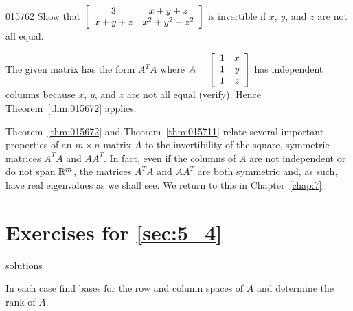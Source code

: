 {{\begin{example}{}{015762}
Show that $\left[ \begin{array}{cc}
3 & x + y + z \\
x + y + z & x^2 +y^2 + z^2
\end{array} \right]$ is invertible if $x$, $y$, and $z$ are not all equal.

\begin{solution}
The given matrix has the form $A^{T}A$ where $A =
\left[ \begin{array}{rr}
1 & x\\
1 & y \\
1 & z
\end{array} \right]$ has independent columns because $x$, $y$, and $z$ are not all equal (verify). Hence Theorem~\ref{thm:015672} applies.
\end{solution}
\end{example}

Theorem~\ref{thm:015672} and Theorem~\ref{thm:015711} relate several important properties of an $m \times n$ matrix $A$ to the invertibility of the square, symmetric matrices $A^{T}A$ and $AA^{T}$. In fact, even if the columns of $A$ are not independent or do not span $\mathbb{R}^m$, the matrices $A^{T}A$ and $AA^T$ are both symmetric and, as such, have real eigenvalues as we shall see. We return to this in Chapter~\ref{chap:7}.

\section*{Exercises for \ref{sec:5_4}}

\begin{Filesave}{solutions}
\end{Filesave}

\begin{multicols}{2}
\begin{ex}
In each case find bases for the row and column spaces of $A$ and determine the rank of $A$.


\end{ex}
\end{multicols}}}
